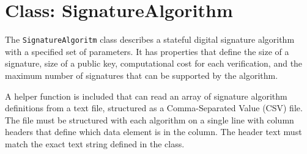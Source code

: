\documentclass{article}
\begin{document}
\appendix

\section{Class: SignatureAlgorithm}
\label{signature_algorithm}
The \texttt{SignatureAlgoritm} class describes a stateful digital signature algorithm with a specified set of parameters.  It has properties that define the size of a signature, size of a public key, computational cost for each verification, and the maximum number of signatures that can be supported by the algorithm.

A helper function is included that can read an array of signature algorithm definitions from a text file, structured as a Comma-Separated Value (CSV) file.  The file must be structured with each algorithm on a single line with column headers that define which data element is in the column.  The header text must match the exact text string defined in the class.  
\end{document}
